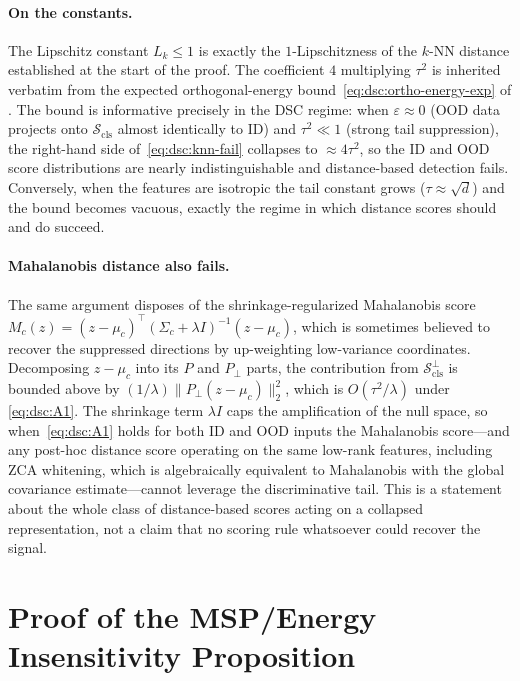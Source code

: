 \paragraph{On the constants.}
The Lipschitz constant $L_k \le 1$ is exactly the $1$-Lipschitzness of the
$k$-NN distance established at the start of the proof. The coefficient $4$
multiplying $\tau^2$ is inherited verbatim from the expected orthogonal-energy
bound~\eqref{eq:dsc:ortho-energy-exp} of . The bound
is informative precisely in the DSC regime: when $\varepsilon \approx 0$ (OOD
data projects onto $\mathcal{S}_{\mathrm{cls}}$ almost identically to ID) and
$\tau^2 \ll 1$ (strong tail suppression), the right-hand side
of~\eqref{eq:dsc:knn-fail} collapses to $\approx 4\tau^2$, so the ID and OOD
score distributions are nearly indistinguishable and distance-based detection
fails. Conversely, when the features are isotropic the tail constant grows
($\tau \approx \sqrt{d}$) and the bound becomes vacuous, exactly the regime in
which distance scores should and do succeed.

\paragraph{Mahalanobis distance also fails.}
The same argument disposes of the shrinkage-regularized Mahalanobis score
$M_c(z) = (z - \mu_c)^\top (\Sigma_c + \lambda I)^{-1}(z - \mu_c)$, which is
sometimes believed to recover the suppressed directions by up-weighting
low-variance coordinates. Decomposing $z - \mu_c$ into its $P$ and $P_\perp$
parts, the contribution from $\mathcal{S}_{\mathrm{cls}}^\perp$ is bounded above
by $(1/\lambda)\|P_\perp(z - \mu_c)\|_2^2$, which is $O(\tau^2/\lambda)$ under
\eqref{eq:dsc:A1}. The shrinkage term $\lambda I$ caps the amplification of the
null space, so when~\eqref{eq:dsc:A1} holds for both ID and OOD inputs the
Mahalanobis score---and any post-hoc distance score operating on the same
low-rank features, including ZCA whitening, which is algebraically equivalent to
Mahalanobis with the global covariance estimate---cannot leverage the
discriminative tail. This is a statement about the whole class of distance-based
scores acting on a collapsed representation, not a claim that no scoring rule
whatsoever could recover the signal.

\section{Proof of the MSP/Energy Insensitivity Proposition}
\label{sec:dsc-proofs:prop}

